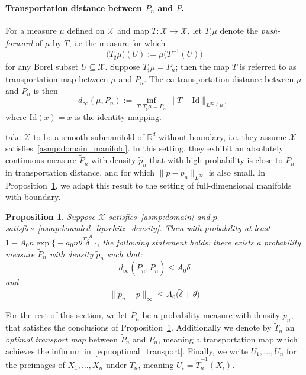 \documentclass[twoside]{article}
\newcommand{\Reals}{\mathbb{R}}
\newcommand{\1}{\mathbf{1}}
\newcommand{\Rd}{\Reals^d}
\newcommand{\Xset}{\mathcal{X}}
\newcommand{\Leb}{L}
\newcommand{\wt}[1]{\widetilde{#1}}
\newtheorem{proposition}{Proposition}
\theoremstyle{definition}
\theoremstyle{remark}
\begin{document}
\paragraph{Transportation distance between $P_n$ and $P$.}
For a measure $\mu$ defined on $\Xset$ and map $T: \Xset \to \Xset$, let $T_{\sharp}\mu$ denote the \emph{push-forward} of $\mu$ by $T$, i.e the measure for which
\begin{equation*}
\bigl(T_{\sharp}\mu\bigr)(U) := \mu\bigl(T^{-1}(U)\bigr)
\end{equation*}
for any Borel subset $U \subseteq \Xset$. Suppose $T_{\sharp}\mu = P_n$; then the map $T$ is referred to as transportation map between $\mu$ and $P_n$. The  $\infty$-transportation distance between $\mu$ and $P_n$ is then
\begin{equation}
\label{eqn:optimal_transport}
d_{\infty}(\mu,P_n) := \inf_{T: T_{\sharp} \mu = P_n} \|T - \mathrm{Id}\|_{L^{\infty}(\mu)}
\end{equation}
where $\mathrm{Id}(x) = x$ is the identity mapping.

\citet{calder2019} take $\Xset$ to be a smooth submanifold of $\Rd$ without boundary, i.e. they assume $\Xset$ satisfies~\ref{asmp:domain_manifold}. In this setting, they exhibit an absolutely continuous measure $\wt{P}_n$ with density $\wt{p}_n$ that with high probability is close to $P_n$ in transportation distance, and for which $\|p - \wt{p}_n\|_{\Leb^\infty}$ is also small. In Proposition~\ref{prop:optimal_transport}, we adapt this result to the setting of full-dimensional manifolds with boundary.  
\begin{proposition}
	\label{prop:optimal_transport}
	Suppose $\Xset$ satisfies~\ref{asmp:domain} and $p$ satisfies~\ref{asmp:bounded_lipschitz_density}. Then with probability at least $1 - A_0 n \exp\bigl\{-a_0 n\theta^2\wt{\delta}^d\bigr\}$, the following statement holds: there exists a probability measure $\wt{P}_n$ with density $\wt{p}_n$ such that:
	\begin{equation}
	\label{eqn:optimal_transport_1}
	d_{\infty}(\wt{P}_n, P_n) \leq A_0 \wt{\delta}
	\end{equation}
	and
	\begin{equation}
	\label{eqn:optimal_transport_2}
	\|\wt{p}_n - p\|_{\infty} \leq A_0\bigl(\wt{\delta} + \theta\bigr)
	\end{equation}
\end{proposition}
For the rest of this section, we let $\wt{P}_n$ be a probability measure with density $\wt{p}_n$, that satisfies the conclusions of Proposition~\ref{prop:optimal_transport}. Additionally we denote by $\wt{T}_n$ an \emph{optimal transport map} between $\wt{P}_n$ and $P_n$, meaning a transportation map which achieves the infimum in~\eqref{eqn:optimal_transport}. Finally, we write $U_1,\ldots,U_n$ for the preimages of $X_1,\ldots,X_n$ under $\wt{T}_n$, meaning $U_i = \wt{T}_n^{-1}(X_i)$. 
\end{document}

